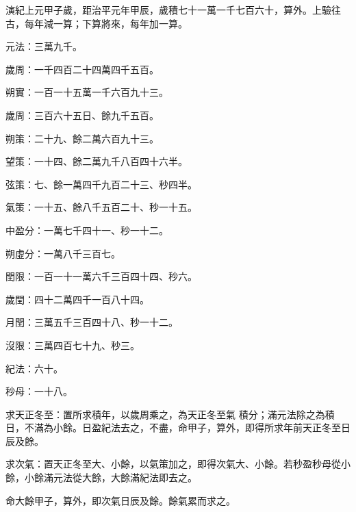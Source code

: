 \begin{pinyinscope}
 演紀上元甲子歲，距治平元年甲辰，歲積七十一萬一千七百六十，算外。上驗往古，每年減一算；下算將來，每年加一算。



 元法：三萬九千。



 歲周：一千四百二十四萬四千五百。



 朔實：一百一十五萬一千六百九十三。



 歲周：三百六十五日、餘九千五百。



 朔策：二十九、餘二萬六百九十三。



 望策：一十四、餘二萬九千八百四十六半。



 弦策：七、餘一萬四千九百二十三、秒四半。



 氣策：一十五、餘八千五百二十、秒一十五。



 中盈分：一萬七千四十一、秒一十二。



 朔虛分：一萬八千三百七。



 閏限：一百一十一萬六千三百四十四、秒六。



 歲閏：四十二萬四千一百八十四。



 月閏：三萬五千三百四十八、秒一十二。



 沒限：三萬四百七十九、秒三。



 紀法：六十。



 秒母：一十八。



 求天正冬至：置所求積年，以歲周乘之，為天正冬至氣
 積分；滿元法除之為積日，不滿為小餘。日盈紀法去之，不盡，命甲子，算外，即得所求年前天正冬至日辰及餘。



 求次氣：置天正冬至大、小餘，以氣策加之，即得次氣大、小餘。若秒盈秒母從小餘，小餘滿元法從大餘，大餘滿紀法即去之。



 命大餘甲子，算外，即次氣日辰及餘。餘氣累而求之。




\end{pinyinscope}
